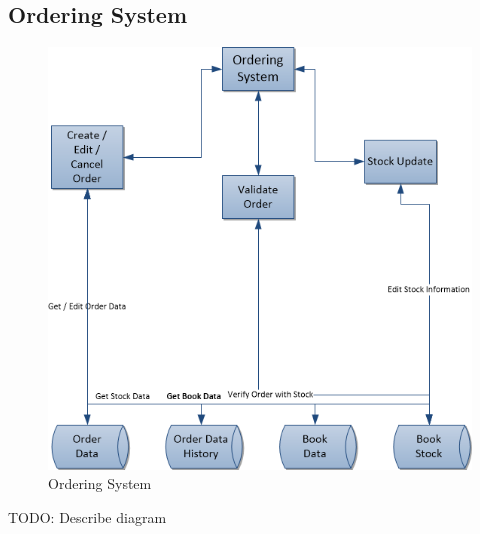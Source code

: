 \documentclass[11pt,a4paper,oneside,svgnames]{report}
\begin{document}
\subsection{Ordering System}
\begin{figure}[H]
 \begin{center}
  \includegraphics[width=\textwidth]{OrderingSystem.png}
 \end{center}
 \caption{Ordering System}
\end{figure}

TODO: Describe diagram
\end{document}
